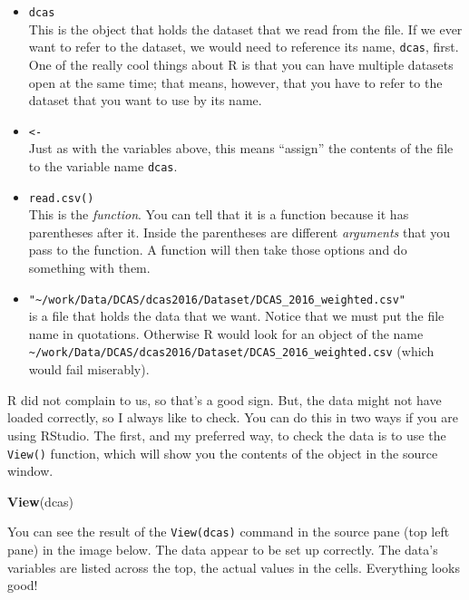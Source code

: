 \documentclass[]{article}
\newenvironment{Shaded}{\begin{snugshade}}{\end{snugshade}}
\newcommand{\KeywordTok}[1]{\textcolor[rgb]{0.13,0.29,0.53}{\textbf{{#1}}}}
\newcommand{\NormalTok}[1]{{#1}}
\begin{document}
\begin{itemize}
\item
  {\texttt{dcas}}\\
  This is the object that holds the dataset that we read from the file.
  If we ever want to refer to the dataset, we would need to reference
  its name, {\texttt{dcas}}, first. One of the really cool things about
  R is that you can have multiple datasets open at the same time; that
  means, however, that you have to refer to the dataset that you want to
  use by its name.
\item
  {\texttt{\textless{}-}}\\
  Just as with the variables above, this means ``assign'' the contents
  of the file to the variable name \texttt{dcas}.
\item
  {\texttt{read.csv()}}\\
  This is the \emph{function}. You can tell that it is a function
  because it has parentheses after it. Inside the parentheses are
  different \emph{arguments} that you pass to the function. A function
  will then take those options and do something with them.
\item
  {\texttt{"\textasciitilde{}/work/Data/DCAS/dcas2016/Dataset/DCAS\_2016\_weighted.csv"}}\\
  is a file that holds the data that we want. Notice that we must put
  the file name in quotations. Otherwise R would look for an object of
  the name
  \texttt{\textasciitilde{}/work/Data/DCAS/dcas2016/Dataset/DCAS\_2016\_weighted.csv}
  (which would fail miserably).
\end{itemize}

R did not complain to us, so that's a good sign. But, the data might not
have loaded correctly, so I always like to check. You can do this in two
ways if you are using RStudio. The first, and my preferred way, to check
the data is to use the \texttt{View()} function, which will show you the
contents of the object in the source window.

\begin{Shaded}
\begin{Highlighting}[]
\KeywordTok{View}\NormalTok{(dcas)}
\end{Highlighting}
\end{Shaded}

You can see the result of the \texttt{View(dcas)} command in the source
pane (top left pane) in the image below. The data appear to be set up
correctly. The data's variables are listed across the top, the actual
values in the cells. Everything looks good!
\end{document}
